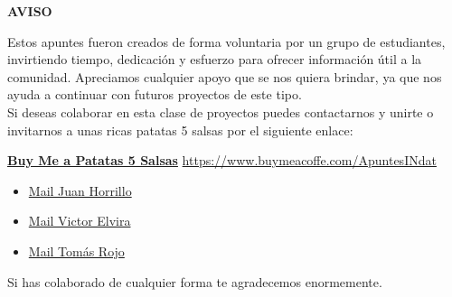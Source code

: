 \begin{center}
    \Huge \textbf{AVISO}
\end{center}

Estos apuntes fueron creados de forma voluntaria por un grupo de estudiantes, invirtiendo tiempo, dedicación y esfuerzo para ofrecer información útil a la comunidad. Apreciamos cualquier apoyo que se nos quiera brindar, ya que nos ayuda a continuar con futuros proyectos de este tipo. \\

Si deseas colaborar en esta clase de proyectos puedes contactarnos y unirte o invitarnos a unas ricas patatas 5 salsas por el siguiente enlace:

\vfil

\begin{center}
    \href{https://www.buymeacoffe.com/ApuntesINdat}{\LARGE \textbf{Buy Me a Patatas 5 Salsas}}
    \href{https://www.buymeacoffe.com/ApuntesINdat}{https://www.buymeacoffe.com/ApuntesINdat}
\end{center}

\begin{itemize}
    \item \href{mailto:juan.horrillo22@estudiantes.uva.es}{Mail Juan Horrillo}
    \item \href{mailto:victor.elvira22@estudiantes.uva.es}{Mail Victor Elvira}
    \item \href{mailto:tomas.rojo22@estudiantes.uva.es}{Mail Tomás Rojo}
\end{itemize}

\vfil

Si has colaborado de cualquier forma te agradecemos enormemente.

